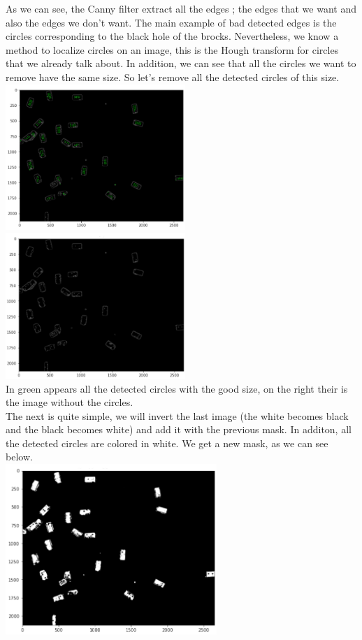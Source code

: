\documentclass{article}
\begin{document}
As we can see, the Canny filter extract all the edges ; the edges that we want and also the edges we don't want. The main example of bad detected edges is the circles corresponding to the black hole of the brocks. Nevertheless, we know a method to localize circles on an image, this is the Hough transform for circles that we already talk about. In addition, we can see that all the circles we want to remove have the same size. So let's remove all the detected circles of this size.\\
\includegraphics[width=6.8cm]{images/img29.png} 
\includegraphics[width=6.8cm]{images/img30.png}\\
In green appears all the detected circles with the good size, on the right their is the image without the circles.\\

The next is quite simple, we will invert the last image (the white becomes black and the black becomes white) and add it with the previous mask. In additon, all the detected circles are colored in white. We get a new mask, as we can see below.\\
\includegraphics[width=8cm]{images/img31.png}\\
\end{document}
